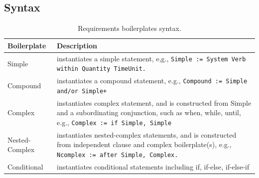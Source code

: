 \subsection{Syntax}
\begin{table}[h]\small
	\begin{tabular}{@{}lp{}@{}}
		\toprule
		Boilerplate & Description \\ \midrule
		Simple & instantiates a simple statement, e,g., \texttt{Simple := System Verb within Quantity TimeUnit.} \\
		Compound & instantiates a compound statement, e.g., \texttt{Compound := Simple and/or {Simple}+} \\
		Complex & instantiates complex statement, and is constructed from Simple and a subordinating conjunction, such as when, while, until, e.g., \texttt{Complex := if Simple, Simple} \\
		Nested-Complex & instantiates nested-complex statements, and is constructed from independent clause and complex boilerplate(s), e.g., \texttt{Ncomplex := after Simple, Complex.} \\
		Conditional & instantiates conditional statements including if, if-else, if-else-if \\ \bottomrule
	\end{tabular}
\caption{Requirements boilerplates syntax.}
\end{table}

\begin{table}[h]
\noindent{}%
\caption{Examples of requirments specified in ReSA.}\label{fig_resa_examples}
\end{table}

